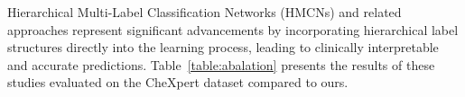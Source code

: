 Hierarchical Multi-Label Classification Networks (HMCNs) and related approaches represent significant advancements by incorporating hierarchical label structures directly into the learning process, leading to clinically interpretable and accurate predictions.  Table~\ref{table:abalation} presents the results of these studies evaluated on the CheXpert dataset compared to ours.